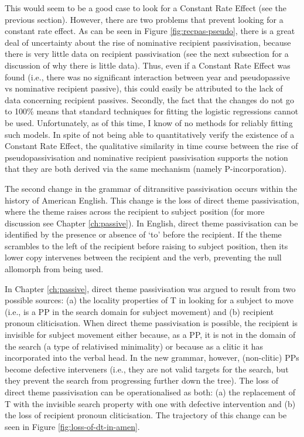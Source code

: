	This would seem to be a good case to look for a Constant Rate Effect (see the previous section). However, there are two problems that prevent looking for a constant rate effect. As can be seen in Figure \ref{fig:recpas-pseudo}, there is a great deal of uncertainty about the rise of nominative recipient passivisation, because there is very little data on recipient passivisation (see the next subsection for a discussion of why there is little data). Thus, even if a Constant Rate Effect was found (i.e., there was no significant interaction between year and pseudopassive vs nominative recipient passive), this could easily be attributed to the lack of data concerning recipient passives. Secondly, the fact that the changes do not go to 100\% means that standard techniques for fitting the logistic regressions cannot be used. Unfortunately, as of this time, I know of no methods for reliably fitting such models. In spite of not being able to quantitatively verify the existence of a Constant Rate Effect, the qualitative similarity in time course between the rise of pseudopassivisation and nominative recipient passivisation supports the notion that they are both derived via the same mechanism (namely P-incorporation).

	The second change in the grammar of ditransitive passivisation occurs within the history of American English. This change is the loss of direct theme passivisation, where the theme raises across the recipient to subject position (for more discussion see Chapter \ref{ch:passive}). In English, direct theme passivisation can be identified by the presence or absence of `to' before the recipient. If the theme scrambles to the left of the recipient before raising to subject position, then its lower copy intervenes between the recipient and the verb, preventing the null allomorph from being used. 
	
	In Chapter \ref{ch:passive}, direct theme passivisation was argued to result from two possible sources: (a) the locality properties of T in looking for a subject to move (i.e., is a PP in the search domain for subject movement) and (b) recipient pronoun cliticisation. When direct theme passivisation is possible, the recipient is invisible for subject movement either because, as a PP, it is not in the domain of the search (a type of relativised minimality) or because as a clitic it has incorporated into the verbal head. In the new grammar, however, (non-clitic) PPs become defective interveners (i.e., they are not valid targets for the search, but they prevent the search from progressing further down the tree). The loss of direct theme passivisation can be operationalised as both: (a) the replacement of T with the invisible search property with one with defective intervention and (b) the loss of recipient pronoun cliticisation. The trajectory of this change can be seen in Figure \ref{fig:loss-of-dt-in-amen}.


